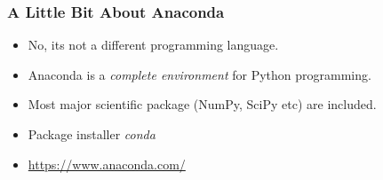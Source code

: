 \begin{frame}
\frametitle{A Little Bit About Anaconda}
\begin{itemize}
\item No, its not a different programming language.
\item Anaconda is a \emph{complete environment} for Python programming.
\item Most major scientific package (NumPy, SciPy etc) are included.
\item Package installer \emph{conda}

\item \url{https://www.anaconda.com/}
\end{itemize}

\end{frame}
